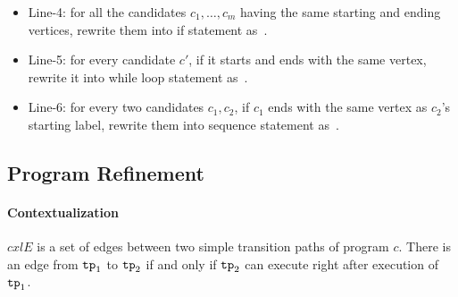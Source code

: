 \begin{itemize}
  \item
  Line-4: for all the candidates $c_1, \ldots, c_m$ having the same starting and ending vertices, rewrite them into if statement as~\cite{GulwaniJK09}.
  \item
  Line-5: for every candidate $c'$, if it starts and ends with the same vertex, rewrite it into while loop statement as~\cite{GulwaniJK09}.
  \item
  Line-6: for every two candidates $c_1, c_2$, if $c_1$ ends with the same vertex as $c_2$'s starting label, rewrite them into sequence statement as~\cite{GulwaniJK09}.
\end{itemize}
\subsection{Program Refinement}

\paragraph{Contextualization}

$cxlE$ is a set of edges between two simple transition paths of program $c$. There is an edge from $\mathtt{tp}_1$ to $\mathtt{tp}_2$
if and only if $\mathtt{tp}_2$ can execute right after execution of $\mathtt{tp}_1$.

